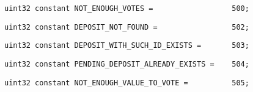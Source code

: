 \begin{lstlisting}[firstnumber=27]
    uint32 constant NOT_ENOUGH_VOTES =                  500;
\end{lstlisting}

\begin{lstlisting}[firstnumber=28]
    uint32 constant DEPOSIT_NOT_FOUND =                 502;
\end{lstlisting}

\begin{lstlisting}[firstnumber=29]
    uint32 constant DEPOSIT_WITH_SUCH_ID_EXISTS =       503;
\end{lstlisting}

\begin{lstlisting}[firstnumber=30]
    uint32 constant PENDING_DEPOSIT_ALREADY_EXISTS =    504;
\end{lstlisting}

\begin{lstlisting}[firstnumber=31]
    uint32 constant NOT_ENOUGH_VALUE_TO_VOTE =          505;
\end{lstlisting}
